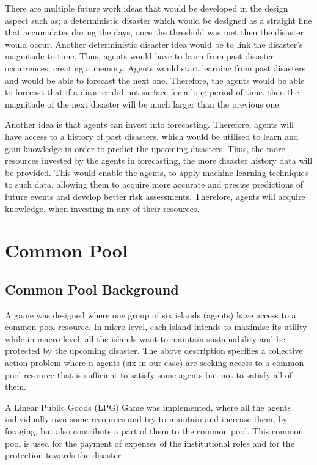 There are multiple future work ideas that would be developed in the design aspect such as; a deterministic disaster which would be  designed as a straight line that accumulates during the days, once the threshold was met then the disaster would occur. Another deterministic disaster idea would be to link the disaster’s magnitude to time. Thus, agents would have to learn from past disaster occurrences, creating a memory. Agents would start learning from past disasters and would be able to forecast the next one. Therefore, the agents would be able to forecast that if a disaster did not surface for a long period of time, then the magnitude of the next disaster will be much larger than the previous one.

Another idea is that agents can invest into forecasting. Therefore, agents will have access to a history of past disasters, which would be utilised to learn and gain knowledge in order to predict the upcoming disasters. Thus, the more resources invested by the agents in forecasting, the more disaster history data will be provided. This would enable the agents, to apply machine learning techniques to such data, allowing them to acquire more accurate and precise predictions of future events and develop better risk assessments. Therefore, agents will acquire knowledge, when investing in any of their resources.


\section{Common Pool}
\subsection{Common Pool Background}

A game was designed where one group of six islands (agents) have access to a common-pool resource. In micro-level, each island intends to maximise its utility while in macro-level, all the islands want to maintain sustainability and be protected by the upcoming disaster. The above description specifies a collective action problem where n-agents (six in our case) are seeking access to a common pool resource that is sufficient to satisfy some agents but not to satisfy all of them.

A Linear Public Goods (LPG) Game was implemented, where all the agents individually own some resources and try to maintain and increase them, by foraging, but also contribute a part of them to the common pool. This common pool is used for the payment of expenses of the institutional roles and for the protection towards the disaster.

